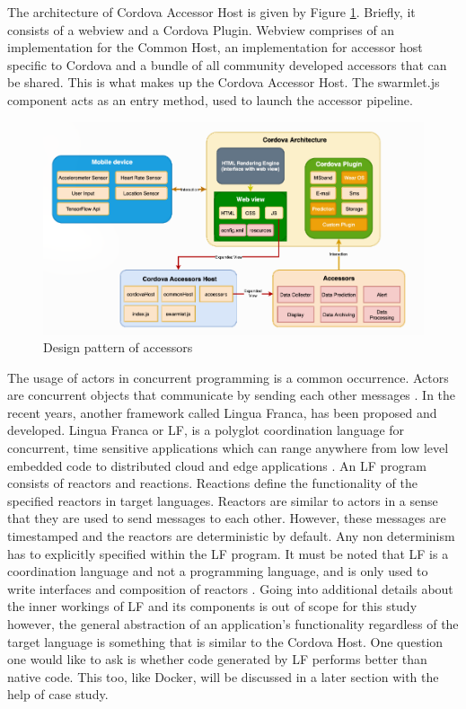 The architecture of Cordova Accessor Host is given by Figure \ref{fig:cordova}. Briefly, it consists of a webview and 
a Cordova Plugin. Webview comprises of an implementation for the Common Host, an implementation for accessor host 
specific to Cordova and a bundle of all community developed accessors that can be shared. This is what makes up the 
Cordova Accessor Host. The swarmlet.js component acts as an entry method, used to launch the accessor pipeline. \\

\begin{figure}
    \begin{center}
        \includegraphics[scale=0.35]{Figs/cordova.png}    
    \end{center}
    \caption{Design pattern of accessors \cite{9446337}}
    \label{fig:cordova}
\end{figure}

The usage of actors in concurrent programming is a common occurrence. Actors are concurrent objects that communicate 
by sending each other messages \cite{lingua}. In the recent years, another framework called Lingua Franca, has been 
proposed and developed. Lingua Franca or LF, is a polyglot coordination language for concurrent, time sensitive applications 
which can range anywhere from low level embedded code to distributed cloud and edge applications \cite{lf-lang}. An LF 
program consists of reactors and reactions. Reactions define the functionality of the specified reactors in target 
languages. Reactors are similar to actors in a sense that they are used to send messages to each other. However, these 
messages are timestamped and the reactors are deterministic by default. Any non determinism has to explicitly specified within 
the LF program. It must be noted that LF is a coordination language and not a programming language, and is only 
used to write interfaces and composition of reactors \cite{lf-lang}. Going into additional details about the inner workings 
of LF and its components is out of scope for this study however, the general abstraction of an application's 
functionality regardless of the target language is something that is similar to the Cordova Host. One question one would 
like to ask is whether code generated by LF performs better than native code. This too, like Docker, will be discussed in a 
later section with the help of case study.
